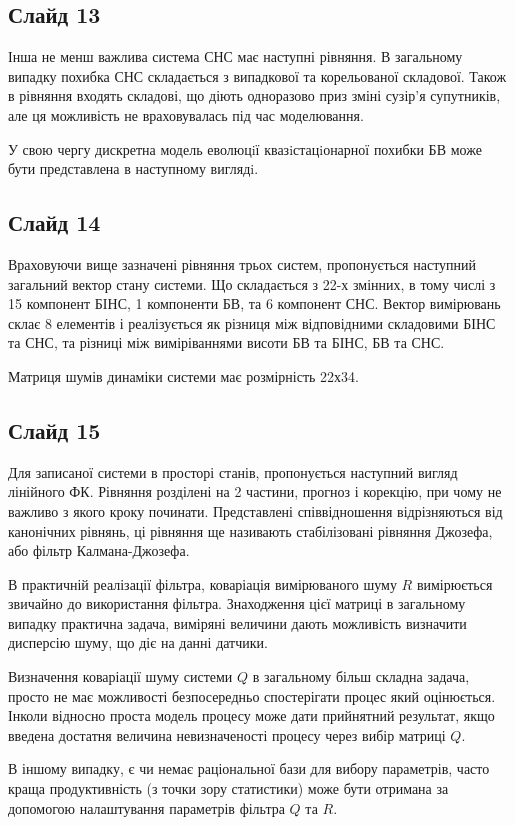 \documentclass[ukrainian,utf8,simple,floatsubsection, hpadding=1mm,equationsubsection,]{eskdtext}
\begin{document}
\subsection*{Слайд 13}
Інша не менш важлива система СНС має наступні рівняння. В загальному випадку похибка СНС складається з випадкової та корельованої складової. Також в рівняння входять складові, що діють одноразово приз зміні сузір’я супутників, але ця можливість не враховувалась під час моделювання.

У свою чергу дискретна модель еволюцiї квазiстацiонарної похибки БВ може бути представлена в наступному виглядi.
\subsection*{Слайд 14}

Враховуючи вище зазначені рівняння трьох систем, пропонується наступний загальний вектор стану системи. Що складається з 22-х змінних, в тому числі з 15 компонент БІНС, 1 компоненти БВ, та 6 компонент СНС.
Вектор вимірювань склає 8 елементів і реалізується як різниця між відповідними складовими БІНС та СНС, та різниці між виміріваннями висоти БВ та БІНС, БВ та СНС.

Матриця шумів динаміки системи має розмірність 22х34.

\subsection*{Слайд 15}
Для записаної системи в просторі станів, пропонується наступний вигляд лінійного ФК. Рівняння розділені на 2 частини, прогноз і корекцію, при чому не важливо з якого кроку починати. Представлені співвідношення відрізняються від канонічних рівнянь, ці рівняння ще називають стабілізовані рівняння Джозефа, або фільтр Калмана-Джозефа. 


В практичній реалізації фільтра, коваріація вимірюваного шуму $R$ вимірюється
звичайно до використання фільтра. Знаходження цієї матриці в загальному випадку
практична задача, виміряні величини дають можливість визначити дисперсію шуму, що
діє на данні датчики.

Визначення коваріації шуму системи $Q$ в загальному більш складна задача,
просто не має можливості безпосередньо спостерігати процес який оцінюється.
Інколи відносно проста модель процесу може дати прийнятний результат, якщо
введена достатня величина невизначеності процесу через вибір матриці $Q$.

В іншому випадку, є чи немає раціональної бази для вибору параметрів, часто
краща продуктивність (з точки зору статистики) може бути отримана за допомогою
налаштування параметрів фільтра $Q$ та $R$. 
\end{document}
